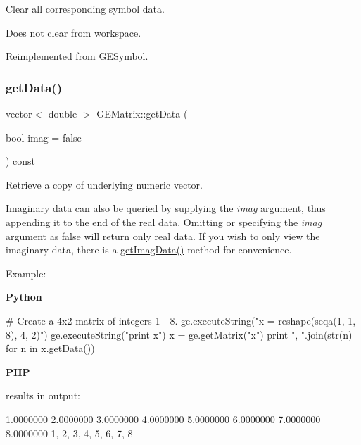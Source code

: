 Clear all corresponding symbol data. 

Does not clear from workspace. 

Reimplemented from \hyperlink{class_g_e_symbol_a39d2e523aec771a73e1cc5d7a9618b88}{G\+E\+Symbol}.

\mbox{\label{class_g_e_matrix_a49482e136fe25e61e8afc3eb2355146b}} 
\subsubsection{\texorpdfstring{get\+Data()}{getData()}}
{\footnotesize\ttfamily vector$<$ double $>$ G\+E\+Matrix\+::get\+Data (\begin{DoxyParamCaption}\item[{bool}]{imag = {\ttfamily false} }\end{DoxyParamCaption}) const}



Retrieve a copy of underlying numeric vector. 

Imaginary data can also be queried by supplying the {\itshape imag} argument, thus appending it to the end of the real data. Omitting or specifying the {\itshape imag} argument as {\ttfamily false} will return only real data. If you wish to only view the imaginary data, there is a \hyperlink{class_g_e_matrix_a7610a3e67e0729c3a1d4ae5648d2aae5}{get\+Imag\+Data()} method for convenience.

Example\+:

{\bfseries Python} 
\begin{DoxyCode}
\textcolor{comment}{# Create a 4x2 matrix of integers 1 - 8.}
ge.executeString(\textcolor{stringliteral}{"x = reshape(seqa(1, 1, 8), 4, 2)"})
ge.executeString(\textcolor{stringliteral}{"print x"})
x = ge.getMatrix(\textcolor{stringliteral}{"x"})
\textcolor{keywordflow}{print} \textcolor{stringliteral}{", "}.join(str(n) \textcolor{keywordflow}{for} n \textcolor{keywordflow}{in} x.getData())
\end{DoxyCode}


{\bfseries P\+HP} 
 results in output\+: 
\begin{DoxyCode}
       1.0000000        2.0000000
       3.0000000        4.0000000
       5.0000000        6.0000000
       7.0000000        8.0000000
1, 2, 3, 4, 5, 6, 7, 8
\end{DoxyCode}



